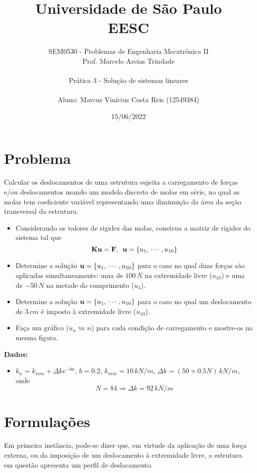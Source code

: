\documentclass[a4paper, 12pt]{article}
\title{Universidade de São Paulo \\ EESC}
\author{SEM0530 - Problemas de Engenharia Mecatrônica II \\ 
Prof. Marcelo Areias Trindade \\ \\ Prática 3 - Solução de sistemas lineares
\\ \\ Aluno: Marcus Vinícius Costa Reis (12549384)}
\date{15/06/2022}
\begin{document}
	\maketitle \newpage
	
	\section{Problema}
	
	Calcular os deslocamentos de uma estrutura sujeita a carregamento de forças e/ou deslocamentos usando
	um modelo discreto de molas em série, no qual as molas tem coeficiente variável representando uma
	diminuição da área da seção transversal da estrutura.
	
	\begin{itemize}
		\item Considerando os valores de rigidez das molas, construa a matriz de rigidez do sistema tal que 
		$$\textrm{\textbf{Ku}}=\textrm{\textbf{F}},\,\,\,\textrm{\textbf{u}}= \{u_1,\,\cdots ,u_{10}\}$$
		\item Determine a solução $\textrm{\textbf{u}}= \{u_1,\,\cdots ,u_{10}\}$ para o caso no qual duas forças são aplicadas
		simultaneamente: uma de $100\,N$ na extremidade livre ($u_{10}$) e uma de $-50\,N$ na metade do comprimento ($u_5$).
		\item Determine a solução $\textrm{\textbf{u}}= \{u_1,\,\cdots ,u_{10}\}$ para o caso no qual um deslocamento 
		de $3\,cm$ é imposto à extremidade livre ($u_{10}$).
		\item Faça um gráfico ($u_n$ vs $n$) para cada condição de carregamento e mostre-os na mesma figura. 	
	\end{itemize}
	
	\textbf{Dados:}
	
	\begin{itemize}
		\item $k_n=k_{min}+\Delta ke^{-bn}$, $b=0.2$, $k_{min}=10\,kN/m$, $\Delta k=(50+0.5N)\,kN/m$, onde
		$$N=84\Rightarrow \Delta k=92\,kN/m$$		
	\end{itemize}
	
	\section{Formulações}
	
	Em primeira instância, pode-se dizer que, em virtude da aplicação de uma força externa, ou da imposição de um 
	deslocamento à extremidade livre, a estrutura em questão apresenta um perfil de deslocamento.
	
\end{document}
